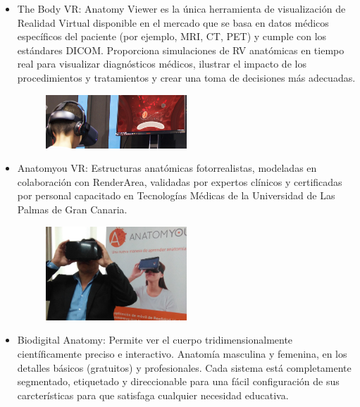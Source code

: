 \begin{itemize}
\item The Body VR: Anatomy Viewer es la única herramienta de visualización de Realidad Virtual disponible en el mercado que se basa en datos médicos específicos del 
paciente (por ejemplo, MRI, CT, PET) y cumple con los estándares DICOM. Proporciona simulaciones de RV anatómicas en tiempo real para visualizar diagnósticos médicos, 
ilustrar el impacto de los procedimientos y tratamientos y crear una toma de decisiones más adecuadas.\cite{web20}
\begin{figure}[H]
	\begin{center}
 		\includegraphics[width = 0.5\textwidth]{source/images/image9.png}
	\end{center} 
\end{figure}
\item Anatomyou VR: Estructuras anatómicas fotorrealistas, modeladas en colaboración con RenderArea, validadas por expertos clínicos y certificadas por personal capacitado 
en  Tecnologías Médicas de la Universidad de Las Palmas de Gran Canaria.\cite{web21}
\begin{figure}[H]
	\begin{center}
 		\includegraphics[width = 0.5\textwidth]{source/images/image59.png}
	\end{center} 
\end{figure}
\item Biodigital Anatomy: Permite ver el cuerpo tridimensionalmente científicamente preciso e interactivo. Anatomía masculina y femenina, en los detalles 
básicos (gratuitos) y profesionales. Cada sistema está completamente segmentado, etiquetado y direccionable para una fácil configuración de sus carcterísticas para que satisfaga cualquier necesidad educativa.\cite{web22}

\end{itemize}
